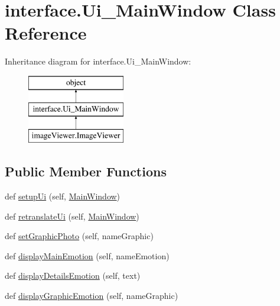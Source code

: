 \hypertarget{classinterface_1_1_ui___main_window}{}\section{interface.\+Ui\+\_\+\+Main\+Window Class Reference}
\label{classinterface_1_1_ui___main_window}
Inheritance diagram for interface.\+Ui\+\_\+\+Main\+Window\+:\begin{figure}[H]
\begin{center}
\leavevmode
\includegraphics[height=3.000000cm]{classinterface_1_1_ui___main_window}
\end{center}
\end{figure}
\subsection*{Public Member Functions}
\begin{DoxyCompactItemize}
\item 
def \hyperlink{classinterface_1_1_ui___main_window_a8aee73c26067cbf824ccc04cadc38965}{setup\+Ui} (self, \hyperlink{namespaceinterface_a2992487bd5cfe196771a900a60d65114}{Main\+Window})
\item 
def \hyperlink{classinterface_1_1_ui___main_window_ac07050b921374440e9140d6ee459ea85}{retranslate\+Ui} (self, \hyperlink{namespaceinterface_a2992487bd5cfe196771a900a60d65114}{Main\+Window})
\item 
def \hyperlink{classinterface_1_1_ui___main_window_aacf11f369e7a96c6d0bf1305cfcedf88}{set\+Graphic\+Photo} (self, name\+Graphic)
\item 
def \hyperlink{classinterface_1_1_ui___main_window_a246eae494e4d250a84559e83a787f185}{display\+Main\+Emotion} (self, name\+Emotion)
\item 
def \hyperlink{classinterface_1_1_ui___main_window_a513a331cd4e15cd50c7154c9a6349ba5}{display\+Details\+Emotion} (self, text)
\item 
def \hyperlink{classinterface_1_1_ui___main_window_a6607be83da848f1379b3aac3f794ab7c}{display\+Graphic\+Emotion} (self, name\+Graphic)
\end{DoxyCompactItemize}
